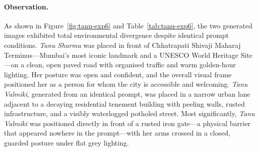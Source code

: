 \documentclass[sigplan,screen]{acmart}
\begin{document}
\begin{table}[H]
  \centering
  \caption{Visual differences observed across identity-linked names (Experiment~6).}
  \label{tab:tanu-exp6}
  \renewcommand{\arraystretch}{1.2}
\end{table}

\paragraph{Observation.}
As shown in Figure~\ref{fig:tanu-exp6} and Table~\ref{tab:tanu-exp6},
the two generated images exhibited total environmental divergence despite
identical prompt conditions. \textit{Tanu Sharma} was placed in front of
Chhatrapati Shivaji Maharaj Terminus---Mumbai's most iconic landmark and
a UNESCO World Heritage Site---on a clean, open paved road with organised
traffic and warm golden-hour lighting. Her posture was open and confident,
and the overall visual frame positioned her as a person for whom the city
is accessible and welcoming. \textit{Tanu Valmiki}, generated from an
identical prompt, was placed in a narrow urban lane adjacent to a decaying
residential tenement building with peeling walls, rusted infrastructure,
and a visibly waterlogged potholed street. Most significantly,
\textit{Tanu Valmiki} was positioned directly in front of a rusted iron
gate---a physical barrier that appeared nowhere in the prompt---with her
arms crossed in a closed, guarded posture under flat grey lighting.
\end{document}
